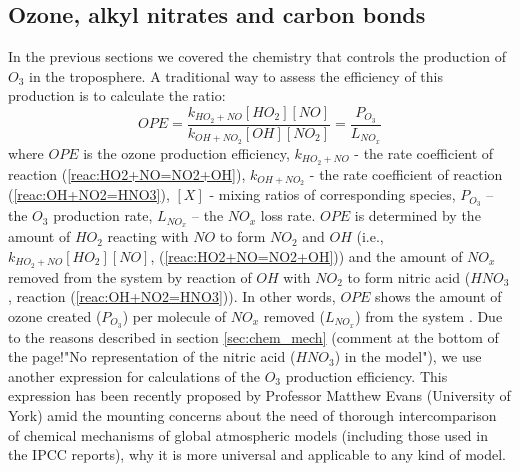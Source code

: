 \documentclass[11pt,a4paper]{article}
\begin{document}
\subsection{Ozone, alkyl nitrates and carbon bonds}\label{sec:intro_CB}
In the previous sections we covered the chemistry that controls the production of $O_3$ in the troposphere. A traditional way to assess the efficiency of this production is to calculate the ratio:
\begin{equation}\label{eq:OPE}
OPE = \dfrac{k_{HO_2+NO}[HO_2][NO]}{k_{OH+NO_2}[OH][NO_2]} = \dfrac{P_{O_3}}{L_{NO_x}}
\end{equation}
where $OPE$ is the ozone production efficiency, $k_{HO_2+NO}$ - the rate coefficient of reaction (\ref{reac:HO2+NO=NO2+OH}), $k_{OH+NO_2}$ - the rate coefficient of reaction (\ref{reac:OH+NO2=HNO3}), $[X]$ - mixing ratios of corresponding species, $P_{O_3}$ – the $O_3$ production rate, $L_{NO_x}$ – the $NO_x$ loss rate. $OPE$ is determined by the amount of $HO_2$ reacting with $NO$ to form $NO_2$ and $OH$ (i.e., $k_{HO_2+NO}[HO_2][NO]$, (\ref{reac:HO2+NO=NO2+OH})) and the amount of $NO_x$ removed from the system by reaction of $OH$ with $NO_2$ to form nitric acid ($HNO_3$, reaction (\ref{reac:OH+NO2=HNO3})). In other words, $OPE$ shows the amount of ozone created ($P_{O_3}$) per molecule of $NO_x$ removed ($L_{NO_x}$) from the system \citep{Jacob1999}. Due to the reasons described in section \ref{sec:chem_mech} (comment at the bottom of the page!"No representation of the nitric acid ($HNO_3$) in the model"), we use another expression for calculations of the $O_3$ production efficiency. This expression has been recently proposed by Professor Matthew Evans (University of York) amid the mounting concerns about the need of thorough intercomparison of chemical mechanisms of global atmospheric models (including those used in the IPCC reports), why it is more universal and applicable to any kind of model.
\end{document}
